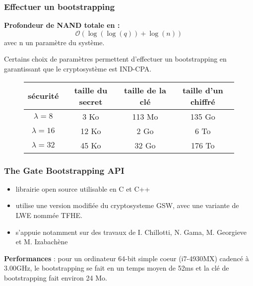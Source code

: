 \documentclass[10pt,xcolor={usenames,dvipsnames}]{beamer}
\begin{document}

\begin{frame} 
\frametitle{Effectuer un bootstrapping}

\textbf{Profondeur de NAND totale en :} 
$$\mathcal{O}(\log(\log(q)) + \log(n))$$
avec n un paramètre du système.

Certains choix de paramètres permettent d'effectuer un bootstrapping en garantissant que le cryptosystème est IND-CPA.
\pause

\begin{figure}
\begin{tabular}{|c|c|c|c|}
\hline
sécurité & taille du secret & taille de la clé & taille d'un chiffré \\
\hline
$\lambda = 8$ & 3 Ko & 113 Mo & 135 Go \\
\hline
$\lambda = 16$ & 12 Ko & 2 Go & 6 To \\
\hline
$\lambda = 32$ & 45 Ko & 32 Go & 176 To \\
\hline
\end{tabular}
\end{figure}
\end{frame}


\begin{frame} 
\frametitle{The Gate Bootstrapping API}
\begin{itemize}
\item librairie open source utilisable en C et C++ 
\item utilise une version modifiée du cryptosysteme GSW, avec une variante de LWE nommée TFHE.
\item s'appuie notamment sur des travaux de I. Chillotti, N. Gama, M. Georgieve et M. Izabachène 
\end{itemize}
\textbf{Performances} : pour un ordinateur 64-bit simple coeur (i7-4930MX) cadencé à 3.00GHz, le bootstrapping se fait en un temps moyen de 52ms
et la clé de bootstrapping fait environ 24 Mo.
 

\end{frame} 
\end{document}
